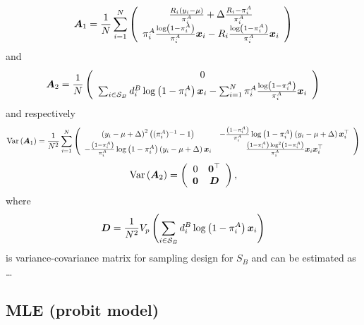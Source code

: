 \documentclass[
  letterpaper,
  DIV=11,
  numbers=noendperiod]{scrreprt}
\begin{document}
\[
\begin{equation*}
    \operatorname{\bA_1} = \frac{1}{N} \sum_{i=1}^N
    \left(\begin{array}{c}
        \frac{R_i\left(y_i - \mu\right)}{\pi_i^A} + \Delta\frac{R_i - \pi_i^A}{\pi_i^A}  \\
       \pi_i^A \frac{\log\left(1 - \pi_i^A\right)}{\pi_i^A} \bx_i -  R_i \frac{\log\left(1 - \pi_i^A\right)}{\pi_i^A} \bx_i
    \end{array}\right)
\end{equation*}
\] and \[
\begin{equation*}
    \operatorname{\bA_2} = \frac{1}{N} 
    \left(\begin{array}{c}
        0  \\
        \sum_{i \in \mathcal{S}_B} d_i^B \log \left(1 - \pi_i^A\right) \bx_i - \sum_{i=1}^N \pi_i^A  \frac{\log \left(1 - \pi_i^A\right)}{\pi_i^A} \bx_i
    \end{array}\right)
\end{equation*}
\] and respectively \[
\begin{equation*}
\operatorname{Var}\left(\bA_1\right) = \frac{1}{N^2} \sum_{i=1}^N
\left(\begin{array}{cc}
    \left(y_i - \mu + \Delta\right)^2 \left((\pi_i^A)^{-1} - 1\right)  & - \frac{\left(1 - \pi_i^A\right)}{\pi_i^A} \log\left(1 - \pi_i^A\right)\left(y_i - \mu + \Delta\right)\bx_i^{\top}  \\
    - \frac{\left(1 - \pi_i^A\right)}{\pi_i^A} \log\left(1 - \pi_i^A\right)\left(y_i - \mu + \Delta\right)\bx_i
    & \frac{\left(1 - \pi_i^A\right) \log^2\left(1 - \pi_i^A\right)}{\pi_i^A} \bx_i \bx_i^{\top}
\end{array}\right)
\end{equation*}
\] \[
\begin{equation*}
\operatorname{Var}\left(\bA_2\right) = 
\left(\begin{array}{cc}
     0 & \boldsymbol{0}^{\top} \\
     \boldsymbol{0} & \bD 
\end{array}\right),
\end{equation*}
\] where \[
\begin{align}
    \boldsymbol{D} = \frac{1}{N^2}V_p\left(\sum_{i \in \mathcal{S}_B} d_i^B \log \left(1 - \pi_i^A\right) \boldsymbol{x}_i\right) 
\end{align}
\] is variance-covariance matrix for sampling design for \(S_B\) and can
be estimated as \ldots{}

\hypertarget{mle-probit-model}{%
\subsection{MLE (probit model)}\label{mle-probit-model}}
\end{document}
